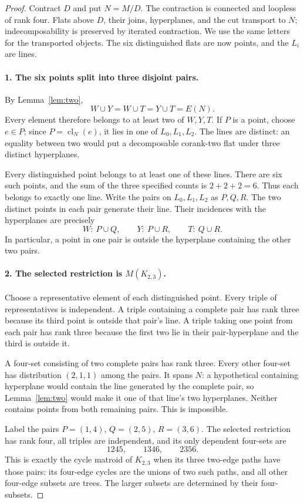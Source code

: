 \documentclass[11pt]{article}
\DeclareMathOperator{\cl}{cl}
\begin{document}
\begin{proof}
Contract $D$ and put $N=M/D$. The contraction is connected and loopless of rank four. Flats above $D$, their joins, hyperplanes, and the cut transport to $N$; indecomposability is preserved by iterated contraction. We use the same letters for the transported objects. The six distinguished flats are now points, and the $L_i$ are lines.

\paragraph{1. The six points split into three disjoint pairs.}
By Lemma~\ref{lem:two},
\[
 W\cup Y=W\cup T=Y\cup T=E(N).
\]
Every element therefore belongs to at least two of $W,Y,T$. If $P$ is a point, choose $e\in P$; since $P=\cl_N(e)$, it lies in one of $L_0,L_1,L_2$. The lines are distinct: an equality between two would put a decomposable corank-two flat under three distinct hyperplanes.

Every distinguished point belongs to at least one of these lines. There are six such points, and the sum of the three specified counts is $2+2+2=6$. Thus each belongs to exactly one line. Write the pairs on $L_0,L_1,L_2$ as $P,Q,R$. The two distinct points in each pair generate their line. Their incidences with the hyperplanes are precisely
\[
 W:\ P\cup Q,\qquad Y:\ P\cup R,\qquad T:\ Q\cup R.
\]
In particular, a point in one pair is outside the hyperplane containing the other two pairs.

\paragraph{2. The selected restriction is $M(K_{2,3})$.}
Choose a representative element of each distinguished point. Every triple of representatives is independent. A triple containing a complete pair has rank three because its third point is outside that pair's line. A triple taking one point from each pair has rank three because the first two lie in their pair-hyperplane and the third is outside it.

A four-set consisting of two complete pairs has rank three. Every other four-set has distribution $(2,1,1)$ among the pairs. It spans $N$: a hypothetical containing hyperplane would contain the line generated by the complete pair, so Lemma~\ref{lem:two} would make it one of that line's two hyperplanes. Neither contains points from both remaining pairs. This is impossible.

Label the pairs $P=(1,4)$, $Q=(2,5)$, $R=(3,6)$. The selected restriction has rank four, all triples are independent, and its only dependent four-sets are
\[
 1245,\qquad1346,\qquad2356.
\]
This is exactly the cycle matroid of $K_{2,3}$ when its three two-edge paths have those pairs: its four-edge cycles are the unions of two such paths, and all other four-edge subsets are trees. The larger subsets are determined by their four-subsets.


\end{proof}
\end{document}
